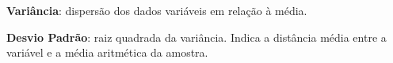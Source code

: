 \begin{multicols*}{2}
	\textbf{Variância}: dispersão dos dados variáveis em relação à média.

	\textbf{Desvio Padrão}: raiz quadrada da variância. Indica a distância média entre a variável e a média aritmética da amostra.


\end{multicols*}
